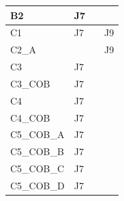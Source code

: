 \begin{longtable}{|l|l|l|l|}
B2                              & J7                                                &                                                  &                                                  \\ \hline
C1                              & J7                                                &                                                  & J9                                                  \\ \hline
C2\_A                              &                                                 &                                                  & J9                                                  \\ \hline
C3                              & J7                                                &                                                  &                                                  \\ \hline
C3\_COB                         & J7                                                &                                                  &                                                  \\ \hline
C4                              & J7                                                &                                                  &                                                  \\ \hline
C4\_COB                         & J7                                                &                                                  &                                                  \\ \hline
C5\_COB\_A                       & J7                                                &                                                  &                                                  \\ \hline
C5\_COB\_B                       & J7                                                &                                                  &                                                  \\ \hline
C5\_COB\_C                       & J7                                                &                                                  &                                                  \\ \hline
C5\_COB\_D                       & J7                                                &                                                  &                                                  \\ \hline

\end{longtable}
